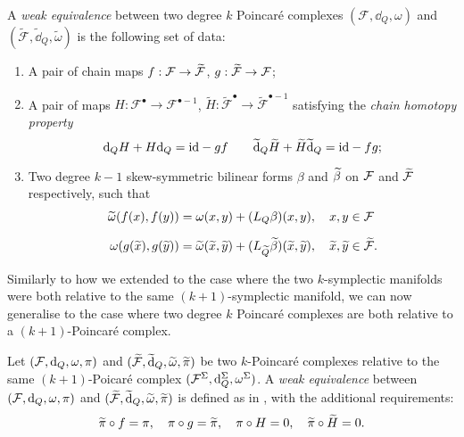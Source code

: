 \begin{definition}
\label{def:weak_eq_Poincaré}
    A \emph{weak equivalence} between two degree $k$ Poincaré complexes $(\mathcal{F}, \dd_Q, \omega)$ and $(\widetilde{\mathcal{F}}, \widetilde{\dd}_Q, \widetilde{\omega})$ is the following set of data:
    \begin{enumerate}[label=\roman*)]
        \item A pair of chain maps $f:\mathcal{F} \rightarrow \widetilde{\mathcal{F}}$, $g:\widetilde{\mathcal{F}} \rightarrow \mathcal{F}$;
        \item A pair of maps $H: \mathcal{F}^\bullet \rightarrow \mathcal{F}^{\bullet -1}$, $\widetilde{H}:\widetilde{\mathcal{F}}^\bullet \rightarrow \widetilde{\mathcal{F}}^{\bullet -1}$ satisfying the \emph{chain homotopy property}
        \begin{equation}
            \dd_Q H + H \dd_Q = \text{id} -gf \qquad \widetilde{\dd}_Q \widetilde{H} + \widetilde{H} \widetilde{\dd}_Q = \text{id} -fg ;
        \end{equation}
        \item Two degree $k-1$ skew-symmetric bilinear forms $\beta$ and $\widetilde{\beta}$ on $\mathcal{F}$ and $\widetilde{\mathcal{F}}$ respectively, such that
        \begin{equation}
            \begin{aligned}
                \widetilde{\omega}(f(x), f(y)) =&
                \; \omega (x, y) +
                (L_Q \beta) (x, y),
                \quad x, y \in \mathcal{F} \\[6pt]
                \omega(g(\widetilde{x}), g(\widetilde{y})) =&
                \; \widetilde{\omega}(\widetilde{x}, \widetilde{y}) +
                (L_{\widetilde{Q}} \widetilde{\beta})(\widetilde{x}, \widetilde{y}),
                \quad \widetilde{x}, \widetilde{y} \in \widetilde{\mathcal{F}}.   
            \end{aligned}
        \end{equation}
    \end{enumerate}
\end{definition}

Similarly to how we extended  to the case where the two $k$-symplectic manifolds were both relative to the same $(k+1)$-symplectic manifold, we can now generalise  to the case where two degree $k$ Poincaré complexes are both relative to a $(k+1)$-Poincaré complex.

\begin{definition}
\label{def:weak_poincaré_relative}
    Let $(\mathcal{F}, \dd_Q, \omega, \pi)$ and $(\widetilde{\mathcal{F}}, \widetilde{\dd}_Q, \widetilde{\omega}, \widetilde{\pi})$ be two $k$-Poincaré complexes relative to the same $(k+1)$-Poicaré complex $(\mathcal{F}^\Sigma, \dd^\Sigma_Q, \omega^\Sigma)$.
    A \emph{weak equivalence} between $(\mathcal{F}, \dd_Q, \omega, \pi)$ and $(\widetilde{\mathcal{F}}, \widetilde{\dd}_Q, \widetilde{\omega}, \widetilde{\pi})$ is defined as in , with the additional requirements:
    \begin{equation*}
        \widetilde{\pi} \circ f = \pi, \quad
        \pi \circ g = \widetilde{\pi}, \quad
        \pi \circ H = 0, \quad
        \widetilde{\pi} \circ \widetilde{H} = 0 .
    \end{equation*}
\end{definition}
